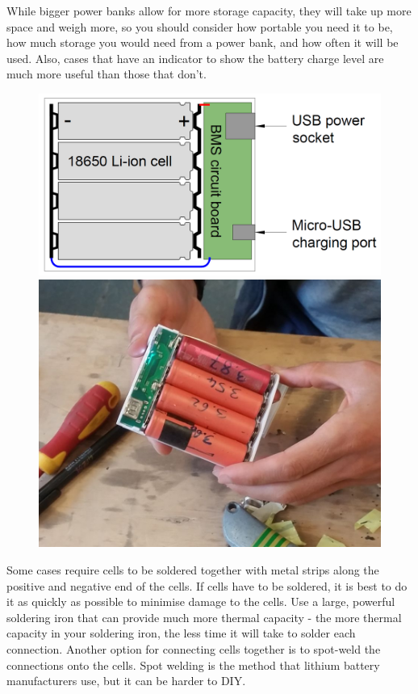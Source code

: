 \documentclass{article}
\theoremstyle{definition}
\theoremstyle{definition}
\theoremstyle{remark}
\begin{document}
  While bigger power banks allow for more storage capacity, they will take up more space and weigh more, so you should consider how portable you need it to be, how much storage you would need from a power bank, and how often it will be used. Also, cases that have an indicator to show the battery charge level are much more useful than those that don’t. 

  \begin{figure}[!ht]
    \centering
    \includegraphics[width=0.35\paperwidth]{Images/image_6_1_(power_bank_diagram).png}
    \includegraphics[width=0.30\paperwidth]{../Images/image_6_2_(power_bank).png}
  \end{figure}

  Some cases require cells to be soldered together with metal strips along the positive and negative end of the cells. If cells have to be soldered, it is best to do it as quickly as possible to minimise damage to the cells. Use a large, powerful soldering iron that can provide much more thermal capacity - the more thermal capacity in your soldering iron, the less time it will take to solder each connection. Another option for connecting cells together is to spot-weld the connections onto the cells. Spot welding is the method that lithium battery manufacturers use, but it can be harder to DIY. 
\end{document}
